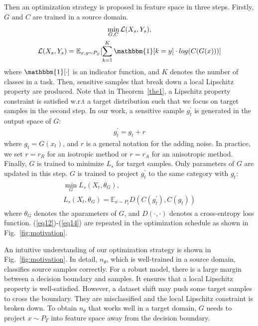 \documentclass[journal,twocolumn]{IEEEtran}
\theoremstyle{definition}
\begin{document}
Then an optimization strategy is proposed in feature space in three steps. Firstly, $G$ and $C$ are trained in a source domain.
\begin{align}
\begin{gathered}
\min_{G,C}{\cal L}(X_s,Y_s),\\
{\cal L}(X_s,Y_s)=\mathbb{E}_{x,y\sim P_S}[\sum_{k=1}^{K}\mathbbm{1}[k=y]\cdot log(C(G(x)))]\label{eq12}
\end{gathered}
\end{align} 
where $\mathbbm{1}[\cdot]$ is an indicator function, and $K$ denotes the number of classes in a task. Then, sensitive samples that break down a local Lipschitz property are produced. Note that in Theorem~\ref{the1}, a Lipschitz property constraint is satisfied w.r.t a target distribution such that we focus on target samples in the second step. In our work, a sensitive sample $g^{\prime}_t$ is generated in the output space of $G$:
\begin{align}
g^{\prime}_t= g_t+r\label{eq13}
\end{align}
where $g_t=G(x_t)$, and $r$ is a general notation for the adding noise. In practice, we set $r=r_{R}$ for an isotropic method or $r=r_{A}$ for an anisotropic method. Finally, $G$ is trained to minimize $L_s$ for target samples. Only parameters of $G$ are updated in this step. $G$ is trained to project $g^{\prime}_t$ to the same category with $g_t$:
\begin{align}
\begin{gathered}
\min_{G}L_s(X_t,\theta_G),\\
L_s(X_t,\theta_G)={\mathbb E}_{x\sim P_t}D(C( g^{\prime}_t),C(g_t))\label{eq14}
\end{gathered}
\end{align}
where $\theta_G$ denotes the aparameters of $G$, and $D(\cdot,\cdot)$ denotes a cross-entropy loss function. (\ref{eq12})-(\ref{eq14}) are repeated in the optimization schedule as shown in Fig.~\ref{fig:motivation}.

An intuitive understanding of our optimization strategy is shown in Fig.~\ref{fig:motivation}. In detail, $n_\theta$, which is well-trained in a source domain, classifies source samples correctly. For a robust model, there is a large margin between a decision boundary and samples. It ensures that a local Lipschitz property is well-satisfied. However, a dataset shift may push some target samples to cross the boundary. They are misclassified and the local Lipschitz constraint is broken down. To obtain $n_\theta$ that works well in a target domain, $G$ needs to project $x\sim P_T$ into feature space away from the decision boundary.
\end{document}

